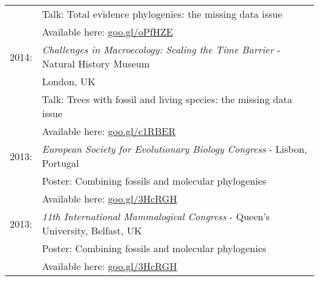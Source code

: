 \documentclass[10pt,a4paper]{article}
\begin{document}
{\begin{tabular}{ll}
& Talk: Total evidence phylogenies: the missing data issue\\
& Available here: \href{http://figshare.com/articles/Total_evidence_phylogenies_the_missing_data_issue/1086216}{goo.gl/oPfHZE}\\
2014: & \textit{Challenges in Macroecology: Scaling the Time Barrier} - Natural History Museum \\
& London, UK\\
& Talk: Trees with fossil and living species: the missing data issue\\
& Available here: \href{http://figshare.com/articles/Trees_with_fossil_and_living_species_the_data_issue/1056307}{goo.gl/c1RBER}\\
2013: & \textit{European Society for Evolutionary Biology Congress} - Lisbon, Portugal\\
& Poster: Combining fossils and molecular phylogenies\\
& Available here: \href{http://figshare.com/articles/Combining_fossils_and_molecular_phylogenies/1056300}{goo.gl/3HcRGH}\\
2013: & \textit{11th International Mammalogical Congress} - Queen's University, Belfast, UK \\
& Poster: Combining fossils and molecular phylogenies\\
& Available here: \href{http://figshare.com/articles/Combining_fossils_and_molecular_phylogenies/1056300}{goo.gl/3HcRGH}\\
\end{tabular}
\bigskip



}
\end{document}
